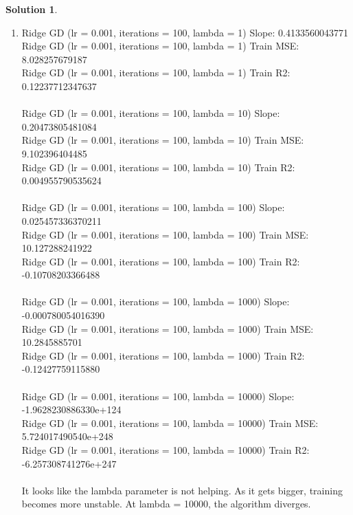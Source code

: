 \documentclass[11pt]{article}
\theoremstyle{definition}
\theoremstyle{nopunct}
\newtheorem*{s}{Solution}
\begin{document}
\begin{s}
\begin{enumerate}
        \item 
            Ridge GD (lr = 0.001, iterations = 100, lambda = 1) Slope: 0.4133560043771 \\
            Ridge GD (lr = 0.001, iterations = 100, lambda = 1) Train MSE: 8.028257679187 \\
            Ridge GD (lr = 0.001, iterations = 100, lambda = 1) Train R2: 0.12237712347637 \\
            \bigskip \\
            Ridge GD (lr = 0.001, iterations = 100, lambda = 10) Slope: 0.20473805481084 \\
            Ridge GD (lr = 0.001, iterations = 100, lambda = 10) Train MSE: 9.102396404485 \\
            Ridge GD (lr = 0.001, iterations = 100, lambda = 10) Train R2: 0.004955790535624 \\
            \bigskip \\
            Ridge GD (lr = 0.001, iterations = 100, lambda = 100) Slope: 0.025457336370211 \\
            Ridge GD (lr = 0.001, iterations = 100, lambda = 100) Train MSE: 10.127288241922 \\
            Ridge GD (lr = 0.001, iterations = 100, lambda = 100) Train R2: -0.10708203366488 \\
            \bigskip \\
            Ridge GD (lr = 0.001, iterations = 100, lambda = 1000) Slope: -0.000780054016390 \\
            Ridge GD (lr = 0.001, iterations = 100, lambda = 1000) Train MSE: 10.2845885701 \\
            Ridge GD (lr = 0.001, iterations = 100, lambda = 1000) Train R2: -0.12427759115880 \\
            \bigskip \\
            Ridge GD (lr = 0.001, iterations = 100, lambda = 10000) Slope: -1.9628230886330e+124 \\
            Ridge GD (lr = 0.001, iterations = 100, lambda = 10000) Train MSE: 5.724017490540e+248 \\
            Ridge GD (lr = 0.001, iterations = 100, lambda = 10000) Train R2: -6.257308741276e+247 \\
            \bigskip \\
            It looks like the lambda parameter is not helping. As it
            gets bigger, training becomes more unstable. At lambda = 10000,
            the algorithm diverges.

    \end{enumerate}
\end{s}
\end{document}
